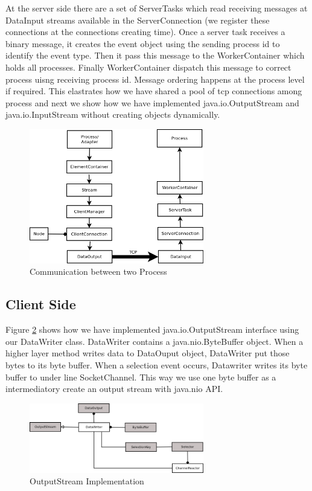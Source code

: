 At the server side there are a set of ServerTasks which read receiving messages at DataInput streams available in the ServerConnection (we register these connections at the connections creating time). Once a server task receives a binary message, it creates the event object using the sending process id to identify the event type. Then it pass this message to the WorkerContainer which holds all processes. Finally WorkerContainer dispatch this message to correct process uisng receiving process id. Message ordering happens at the process level if required. This elastrates how we have shared a pool of tcp connections among process and next we show how we have implemented java.io.OutputStream and java.io.InputStream without creating objects dynamically. 
\begin{figure}[!t]
        \centering
        \includegraphics[width=3.0in]{interprocess.png}
        \caption{Communication between two Process}
        \label{interprocess}
\end{figure}
\subsection{Client Side}
Figure \ref{client} shows how we have implemented java.io.OutputStream interface using our DataWriter class. DataWriter contains a java.nio.ByteBuffer object. When a higher layer method writes data to DataOuput object, DataWriter put those bytes to its byte buffer. When a selection event occurs, Datawriter writes its byte buffer to under line SocketChannel. This way we use one byte buffer as a intermediatory create an output stream with java.nio API.
\begin{figure}[!t]
        \centering
        \includegraphics[width=3.0in]{client.png}
        \caption{OutputStream Implementation}
        \label{client}
\end{figure}
